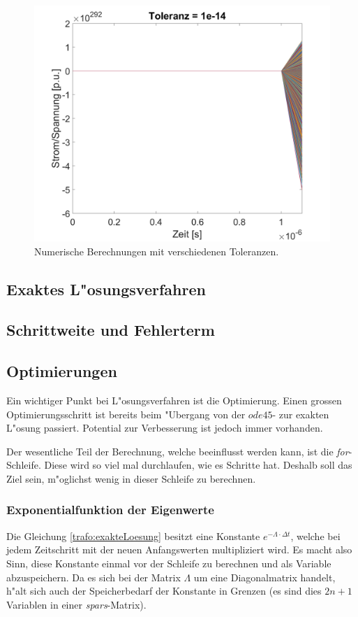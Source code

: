 \begin{refsection}
\begin{figure}
\begin{minipage}{.5\textwidth}
	    \end{minipage}%
	    \begin{minipage}{.5\textwidth}
	        \centering
	        \includegraphics[width=0.7\linewidth]{./trafo/images/svd14.png}
	    \end{minipage}
	    \caption{Numerische Berechnungen mit verschiedenen Toleranzen. }
	    \label{trafo:SVDTol}
	\end{figure}

\subsection{Exaktes L"osungsverfahren}

\subsection{Schrittweite und Fehlerterm}

\subsection{Optimierungen}

Ein wichtiger Punkt bei L"osungsverfahren ist die Optimierung. Einen grossen Optimierungsschritt ist bereits beim "Ubergang von der $ode45$- zur exakten L"osung passiert. Potential zur Verbesserung ist jedoch immer vorhanden.

Der wesentliche Teil der Berechnung, welche beeinflusst werden kann, ist die \textit{for}-Schleife. Diese wird so viel mal durchlaufen, wie es Schritte hat. Deshalb soll das Ziel sein, m"oglichst wenig in dieser Schleife zu berechnen. 

\subsubsection{Exponentialfunktion der Eigenwerte}
Die Gleichung \ref{trafo:exakteLoesung} besitzt eine Konstante $e^{-\Lambda \cdot \Delta t}$, welche bei jedem Zeitschritt mit der neuen Anfangswerten multipliziert wird. Es macht also Sinn, diese Konstante einmal vor der Schleife zu berechnen und als Variable abzuspeichern. Da es sich bei der Matrix $\Lambda$ um eine Diagonalmatrix handelt, h"alt sich auch der Speicherbedarf der Konstante in Grenzen (es sind dies $2n + 1$ Variablen in einer \textit{spars}-Matrix). 


\end{refsection}
